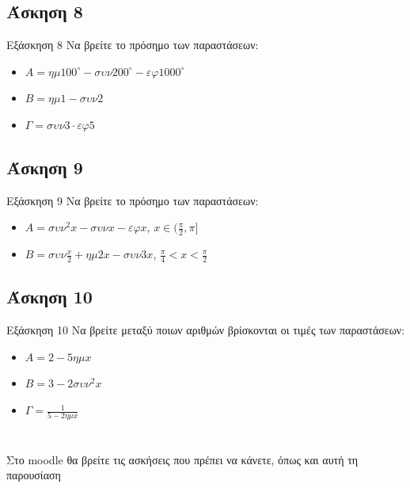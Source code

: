 \documentclass[greek]{beamer}
\begin{document}
\subsection{Άσκηση 8}
\begin{frame}[label=Άσκηση8]{Εξάσκηση 8}
 Να βρείτε το πρόσημο των παραστάσεων:
 \begin{itemize}
  \item<1-> $Α=ημ100^{\circ}-συν200^{\circ}-εφ1000^{\circ}$
  \item<2-> $Β=ημ1-συν2$
  \item<3-> $Γ=συν3 \cdot εφ5$
 \end{itemize}

\end{frame}

\subsection{Άσκηση 9}
\begin{frame}[label=Άσκηση9]{Εξάσκηση 9}
 Να βρείτε το πρόσημο των παραστάσεων:
 \begin{itemize}
  \item<1-> $Α=συν^2x-συνx-εφx$, $x\in (\frac{π}{2},π]$
  \item<2-> $Β=συν\frac{x}{2}+ημ2x-συν3x$, $\frac{π}{4}<x<\frac{π}{2}$
 \end{itemize}

\end{frame}

\subsection{Άσκηση 10}
\begin{frame}[label=Άσκηση10]{Εξάσκηση 10}
 Να βρείτε μεταξύ ποιων αριθμών βρίσκονται οι τιμές των παραστάσεων:
 \begin{itemize}
  \item<1-> $Α=2-5ημx$
  \item<2-> $Β=3-2συν^2x$
  \item<3-> $Γ=\frac{1}{5-2ημx}$
 \end{itemize}

\end{frame}

\section{}
\begin{frame}
 Στο moodle θα βρείτε τις ασκήσεις που πρέπει να κάνετε, όπως και αυτή τη παρουσίαση
\end{frame}

\end{document}
